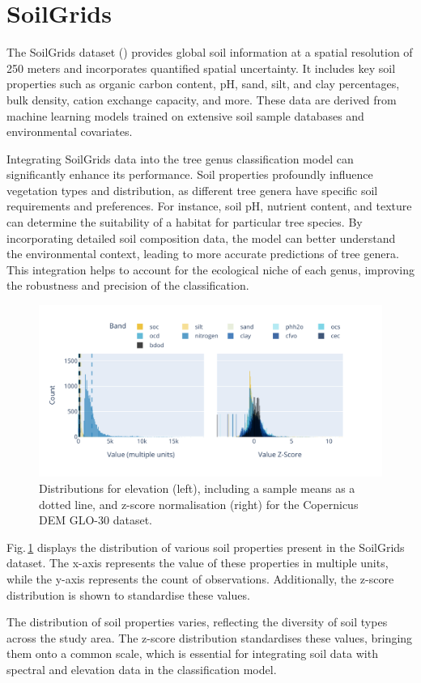 \section{SoilGrids}

The SoilGrids dataset (\cite{soil_report}) provides global soil information at a spatial resolution of 250 meters and incorporates quantified spatial uncertainty. It includes key soil properties such as organic carbon content, pH, sand, silt, and clay percentages, bulk density, cation exchange capacity, and more. These data are derived from machine learning models trained on extensive soil sample databases and environmental covariates.

Integrating SoilGrids data into the tree genus classification model can significantly enhance its performance. Soil properties profoundly influence vegetation types and distribution, as different tree genera have specific soil requirements and preferences. For instance, soil pH, nutrient content, and texture can determine the suitability of a habitat for particular tree species. By incorporating detailed soil composition data, the model can better understand the environmental context, leading to more accurate predictions of tree genera. This integration helps to account for the ecological niche of each genus, improving the robustness and precision of the classification.

\begin{figure}[ht]
    \centering
    \includegraphics[width=0.98\linewidth, trim={15pt 25pt 10pt 20pt}, clip]{figures/figures_features/soil_hist.pdf}
    \caption{Distributions for elevation (left), including a sample means as a dotted line, 
    and z-score normalisation (right) for the Copernicus DEM GLO-30 dataset.}
    \label{fig:soil_hist}
\end{figure}

Fig.\,\ref{fig:soil_hist} displays the distribution of various soil properties present in the SoilGrids dataset. The x-axis represents the value of these properties in multiple units, while the y-axis represents the count of observations. Additionally, the z-score distribution is shown to standardise these values.

The distribution of soil properties varies, reflecting the diversity of soil types across the study area. The z-score distribution standardises these values, bringing them onto a common scale, which is essential for integrating soil data with spectral and elevation data in the classification model.